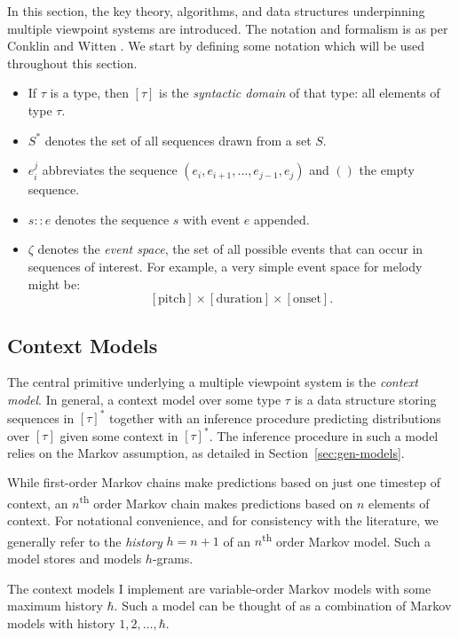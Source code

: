 \documentclass[12pt,a4paper,twoside,openright]{report}
\begin{document}
In this section, the key theory, algorithms, and data structures underpinning
multiple viewpoint systems are introduced. The notation and formalism is as per
Conklin and Witten \cite{conklin1995viewpoints}. We start by defining some
notation which will be used throughout this section.

\begin{itemize}[itemsep=0mm]
  \item If $\tau$ is a type, then $[\tau]$ is the \emph{syntactic domain} of
    that type: all elements of type $\tau$.   
  \item $S^*$ denotes the set of all sequences drawn from a set $S$.
  \item $e_i^j$ abbreviates the sequence $(e_i,e_{i+1},\ldots,e_{j-1},e_j)$ and
    $()$ the empty sequence.
  \item $s :: e$ denotes the sequence $s$ with event $e$ appended.
  \item $\zeta$ denotes the \emph{event space}, the set of all possible events
    that can occur in sequences of interest. For example, a very simple event
    space for melody might be:
    $$ [\mathrm{pitch}] \times [\mathrm{duration}] \times [\mathrm{onset}]. $$
\end{itemize}

\subsection{Context Models}\label{sec:ctx-model-prep}

The central primitive underlying a multiple viewpoint system is the
\emph{context model}. In general, a context model over some type $\tau$ is a
data structure storing sequences in $[\tau]^*$ together with an inference
procedure predicting distributions over $[\tau]$ given some context in
$[\tau]^*$. The inference procedure in such a model relies on the Markov
assumption, as detailed in Section~\ref{sec:gen-models}.

While first-order Markov chains make predictions based on just one timestep of
context, an $n$\textsuperscript{th} order Markov chain makes predictions based
on $n$ elements of context. For notational convenience, and for consistency with
the literature, we generally refer to the \emph{history} $h = n+1$ of an
$n$\textsuperscript{th} order Markov model. Such a model stores and models
$h$-grams.

The context models I implement are variable-order Markov models with some
maximum history $\hbar$. Such a model can be thought of as a combination of
Markov models with history $1,2,\ldots,\hbar$. 
\end{document}
